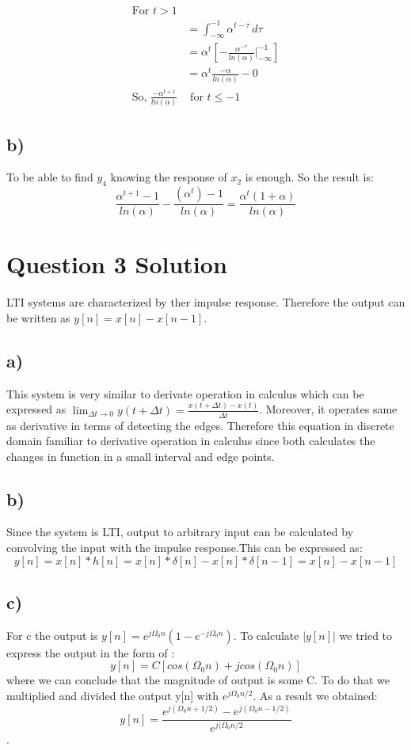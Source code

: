 \documentclass[letterpaper,12pt]{article}
\begin{document}
\begin{equation}
    \begin{split}
        \text{For }t > 1&  \\
        &=   \int_{-\infty}^{-1} \alpha^{t-\tau}  \,d\tau \\
        &= \alpha^t [- \frac{\alpha^{-\tau}}{ln(\alpha)} |_{-\infty}^{-1}]\\
        &= \alpha^t \frac{-\alpha}{ln(\alpha) } - 0\\
        \text{So, } \frac{-\alpha^{t+1}}{ln(\alpha)} &\text{ for } t \leq -1 
    \end{split}
\end{equation}


\subsection{b)}
To be able to find \(y_4\) knowing the response of \(x_2\) is enough. So the result is:
\[
\frac{\alpha^{t+1}-1}{ln(\alpha)} - \frac{(\alpha^t)-1}{ln(\alpha)} = \frac{\alpha^t(1+\alpha)}{ln(\alpha)}    
\]
\section{Question 3 Solution}
LTI systems are characterized by ther impulse response. Therefore the output can be written as \(y[n] = x[n] - x[n-1]\).


\subsection{a)}
This system is very similar to derivate operation in calculus which can be expressed as    \(\lim_{\Delta t \to 0} y(t+ \Delta t) = \frac{x(t+ \Delta t) - x(t)}{\Delta t}\).
  Moreover, it operates same as derivative in terms of detecting the edges. Therefore this equation in discrete domain familiar to derivative operation in calculus since both calculates the changes in function in a small interval and edge points.
\subsection{b)}
Since the system is LTI, output to arbitrary input can be calculated by convolving the input with the impulse response.This can be expressed as: \newline
 \[y[n]= x[n] * h[n] = x[n]* \delta [n] - x[n] * \delta [n-1]= x[n]- x[n-1]\]
\subsection{c)}
For c the output is \( y[n]= e^{j \Omega_0 n} (1-e^{-j \Omega_0 n})\).\newline
To calculate $|y[n]|$ we tried to express the output in the form of :
\[y[n]=C[cos(\Omega_0 n) + jcos(\Omega_0 n)]\] where we can conclude that the magnitude of output is some C. To do that we multiplied and divided the output y[n] with \(e^{j \Omega_0 n/2}\).
As a result we obtained:
 \[y[n]=\frac{e^{j (\Omega_0 n+1/2)}-e^{j (\Omega_0 n-1/2)}}{e^{j (\Omega_0 n/2}}\].
\end{document}
